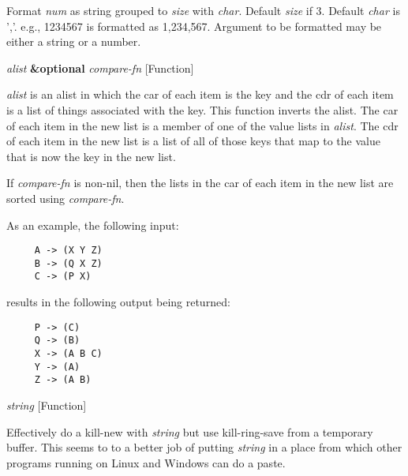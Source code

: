 \begin{doc-string}
Format \emph{num} as string grouped to \emph{size} with \emph{char}.  Default \emph{size} if 3.  Default \emph{char}
is ','.  e.g., 1234567 is formatted as 1,234,567.  Argument to be formatted may be
either a string or a number.
\end{doc-string}

\vspace{1em}
\noindent
{}
\usebox{\funcname}\emph{alist} \textbf{\&optional} \emph{compare-fn}
 \hfill [Function]

\begin{doc-string}
\emph{alist} is an alist in which the car of each item is the key and the cdr of
each item is a list of things associated with the key.  This function inverts
the alist.  The car of each item in the new list is a member of one of the value
lists in \emph{alist}.  The cdr of each item in the new list is a list of all of those
keys that map to the value that is now the key in the new list.

If \emph{compare-fn} is non-nil, then the lists in the car of each item in the new list
are sorted using \emph{compare-fn}.

As an example, the following input:

\small{\begin{verbatim}
     A -> (X Y Z)
     B -> (Q X Z)
     C -> (P X)
\end{verbatim}}

results in the following output being returned:

\small{\begin{verbatim}
     P -> (C)
     Q -> (B)
     X -> (A B C)
     Y -> (A)
     Z -> (A B)
\end{verbatim}}
\end{doc-string}

\vspace{1em}
\noindent
{}
\usebox{\funcname}\emph{string}
 \hfill [Function]

\begin{doc-string}
Effectively do a kill-new with \emph{string} but use kill-ring-save from
a temporary buffer.  This seems to to a better job of putting \emph{string}
in a place from which other programs running on Linux and Windows can
do a paste.
\end{doc-string}

